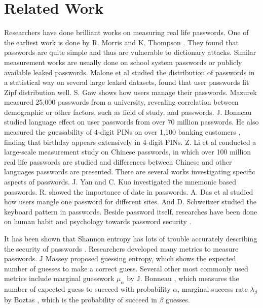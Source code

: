 \section{Related Work}

Researchers have done brilliant works on measuring real life passwords. One of the earliest work is done by R. Morris and K. Thompson \cite{morris1979password}. They found that passwords are quite simple and thus are vulnerable to dictionary attacks. Similar measurement works are usually done on school system passwords or publicly available leaked passwords. Malone et al \cite{malone2012investigating} studied the distribution of passwords in a statistical way on several large leaked datasets, found that user passwords fit Zipf distribution well. S. Gaw \cite{gaw2006password} shows how users manage their passwords. Mazurek \cite{mazurek2013measuring} measured 25,000 passwords from a university, revealing correlation between demographic or other factors, such as field of study, and passwords.   J. Bonneau \cite{bonneau2012science} studied language effect on user passwords from over 70 million passwords. He also measured the guessability of 4-digit PINs on over 1,100 banking customers \cite{bonneau2012birthday}, finding that birthday appears extensively in 4-digit PINs. Z. Li et al \cite{li2014large} conducted a large-scale measurement study on Chinese passwords, in which over 100 million real life passwords are studied and differences between Chinese and other languages passwords are presented. There are several works investigating specific aspects of passwords. J. Yan \cite{yan2004password} and C. Kuo \cite{kuo2006human} investigated the mnemonic based passwords. R.  \cite{veras2012visualizing} showed the importance of date in passwords. A. Das et al \cite{das2014tangled} studied how users mangle one password for different sites. And D. Schweitzer \cite{schweitzer2009visualizing} studied the keyboard pattern in passwords.  Beside password itself, researches have been done on human habit and psychology towards password security \cite{florencio2007large}\cite{howe2012psychology}. 

It has been shown that Shannon entropy has lots of trouble accurately describing the security of passwords \cite{cachin1997entropy}\cite{kelley2012guess}\cite{pliam2000incomparability}\cite{weir2010testing}. Researchers developed many metrics to measure passwords. J Massey \cite{massey1994guessing} proposed guessing entropy, which shows the expected number of guesses to make a correct guess. Several other most commonly used metrics include marginal guesswork $\mu_\alpha$ by J. Bonneau \cite{pliam2000incomparability}, which measures the number of expected guess to succeed with probability $\alpha$,  marginal success rate $\lambda_\beta$ by Boztas \cite{boztas1999entropies}, which is the probability of succeed in $\beta$ guesses.

